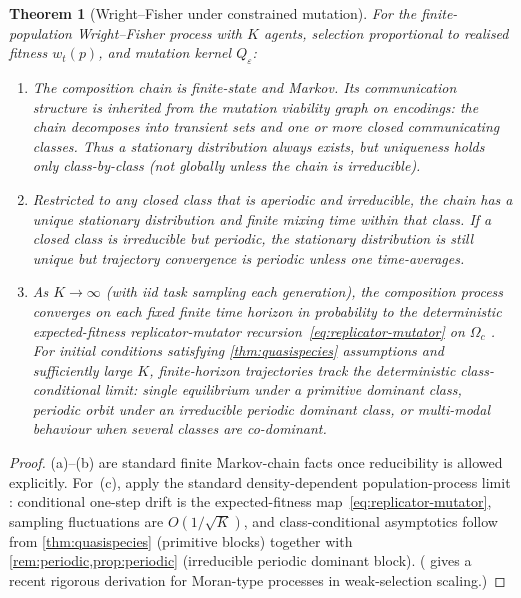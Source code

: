 \documentclass[12pt]{article}
\newtheorem{theorem}{Theorem}[section]
\newcommand{\Qeps}{Q_\varepsilon}
\begin{document}
\begin{theorem}[Wright--Fisher under constrained mutation]\label{thm:wrightfisher}
For the finite-population Wright--Fisher process with $K$ agents, selection proportional to realised fitness $w_t(p)$, and mutation kernel $\Qeps$:

\begin{enumerate}[label=(\alph*)]
\item The composition chain is finite-state and Markov. Its communication structure is inherited from the mutation viability graph on encodings: the chain decomposes into transient sets and one or more closed communicating classes. Thus a stationary distribution always exists, but uniqueness holds only class-by-class (not globally unless the chain is irreducible).

\item Restricted to any closed class that is aperiodic and irreducible, the chain has a unique stationary distribution and finite mixing time within that class. If a closed class is irreducible but periodic, the stationary distribution is still unique but trajectory convergence is periodic unless one time-averages.

\item As $K \to \infty$ (with iid task sampling each generation), the composition process converges on each fixed finite time horizon in probability to the deterministic expected-fitness replicator-mutator recursion~\eqref{eq:replicator-mutator} on $\Omega_c$ \citep[Ch.~11]{ethier_kurtz_1986}. For initial conditions satisfying \cref{thm:quasispecies} assumptions and sufficiently large $K$, finite-horizon trajectories track the deterministic class-conditional limit: single equilibrium under a primitive dominant class, periodic orbit under an irreducible periodic dominant class, or multi-modal behaviour when several classes are co-dominant.
\end{enumerate}
\end{theorem}

\begin{proof}
(a)--(b) are standard finite Markov-chain facts once reducibility is allowed explicitly. For~(c), apply the standard density-dependent population-process limit \citep[Ch.~11]{ethier_kurtz_1986}: conditional one-step drift is the expected-fitness map~\eqref{eq:replicator-mutator}, sampling fluctuations are $O(1/\sqrt{K})$, and class-conditional asymptotics follow from \cref{thm:quasispecies} (primitive blocks) together with \cref{rem:periodic,prop:periodic} (irreducible periodic dominant block). (\citealt{morandotti_orlando_2025} gives a recent rigorous derivation for Moran-type processes in weak-selection scaling.)
\end{proof}
\end{document}

